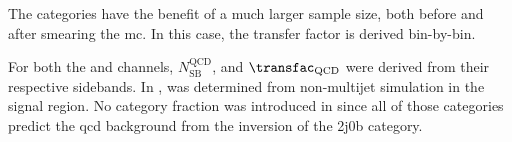 The \VH categories have the benefit of a much larger sample size, both before and after smearing the \acrshort{mc}. In this case, the transfer factor is derived bin-by-bin.

For both the \ttH and \VH channels, $N_{\mathrm{SB}}^{\mathrm{QCD}}$, and $\transfac_{\mathrm{QCD}}$ were derived from their respective sidebands. In \ttH, \catFraction was determined from non-multijet simulation in the signal region. No category fraction was introduced in \VH since all of those categories predict the \acrshort{qcd} background from the inversion of the 2j0b category.
